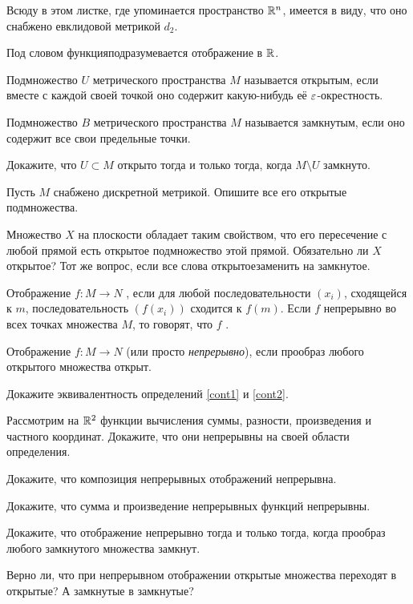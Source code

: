 \documentclass[a4paper,12pt]{article}
\begin{document}

Всюду в этом листке, где упоминается пространство $\mathbb{R}^n$, имеется в виду, что оно снабжено евклидовой метрикой $d_2$.

Под словом  функция подразумевается отображение в $\mathbb{R}$.

Подмножество $U$ метрического пространства $M$ называется  открытым, если вместе с каждой своей точкой оно содержит какую-нибудь её $\varepsilon$-окрестность.

Подмножество $B$ метрического пространства $M$ называется  замкнутым, если оно содержит все свои предельные точки.

Докажите, что $U \subset M$ открыто тогда и только тогда, когда $M \setminus U$ замкнуто.

Пусть $M$ снабжено дискретной метрикой. Опишите все его открытые подмножества.

Множество $X$ на плоскости обладает таким свойством, что его пересечение с любой прямой есть открытое подмножество этой прямой. Обязательно ли $X$ открытое? Тот же вопрос, если все слова  открытое заменить на  замкнутое.

\label{cont1}
Отображение $f \colon M \to N$ , если для любой последовательности $(x_i)$, сходящейся к $m$, последовательность $(f(x_i))$ сходится к $f(m)$. Если $f$ непрерывно во всех точках множества $M$, то говорят, что $f$ .

\label{cont2}
Отображение $f \colon M \to N$  (или просто \emph{непрерывно}), если прообраз любого открытого множества открыт.

Докажите эквивалентность определений \ref{cont1} и \ref{cont2}.

Рассмотрим на $\mathbb{R}^2$ функции вычисления суммы, разности, произведения и частного координат. Докажите, что они непрерывны на своей области определения.

Докажите, что композиция непрерывных отображений непрерывна.

Докажите, что сумма и произведение непрерывных функций непрерывны.

Докажите, что отображение непрерывно тогда и только тогда, когда прообраз любого замкнутого множества замкнут.

Верно ли, что при непрерывном отображении открытые множества переходят в открытые? А замкнутые в замкнутые?
\end{document}
